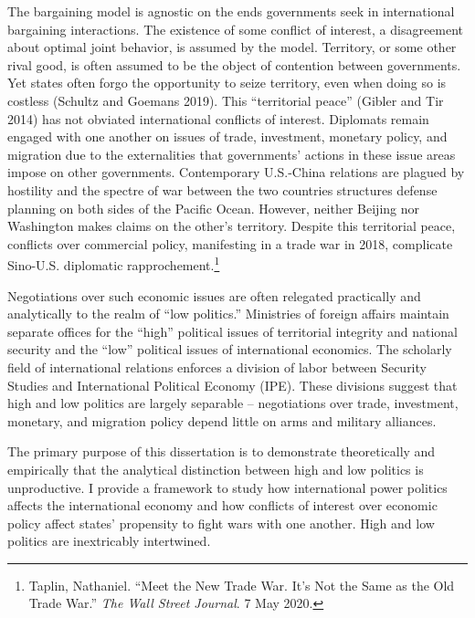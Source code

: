 \documentclass{puthesis}
\begin{document}
The bargaining model is agnostic on the ends governments seek in
international bargaining interactions. The existence of some conflict of
interest, a disagreement about optimal joint behavior, is assumed by the
model. Territory, or some other rival good, is often assumed to be the
object of contention between governments. Yet states often forgo the
opportunity to seize territory, even when doing so is costless (Schultz
and Goemans 2019). This ``territorial peace'' (Gibler and Tir 2014) has
not obviated international conflicts of interest. Diplomats remain
engaged with one another on issues of trade, investment, monetary
policy, and migration due to the externalities that governments' actions
in these issue areas impose on other governments. Contemporary
U.S.-China relations are plagued by hostility and the spectre of war
between the two countries structures defense planning on both sides of
the Pacific Ocean. However, neither Beijing nor Washington makes claims
on the other's territory. Despite this territorial peace, conflicts over
commercial policy, manifesting in a trade war in 2018, complicate
Sino-U.S. diplomatic rapprochement.\footnote{Taplin, Nathaniel. ``Meet
  the New Trade War. It's Not the Same as the Old Trade War.'' \emph{The
  Wall Street Journal}. 7 May 2020.}

Negotiations over such economic issues are often relegated practically
and analytically to the realm of ``low politics.'' Ministries of foreign
affairs maintain separate offices for the ``high'' political issues of
territorial integrity and national security and the ``low'' political
issues of international economics. The scholarly field of international
relations enforces a division of labor between Security Studies and
International Political Economy (IPE). These divisions suggest that high
and low politics are largely separable -- negotiations over trade,
investment, monetary, and migration policy depend little on arms and
military alliances.

The primary purpose of this dissertation is to demonstrate theoretically
and empirically that the analytical distinction between high and low
politics is unproductive. I provide a framework to study how
international power politics affects the international economy and how
conflicts of interest over economic policy affect states' propensity to
fight wars with one another. High and low politics are inextricably
intertwined.
\end{document}

